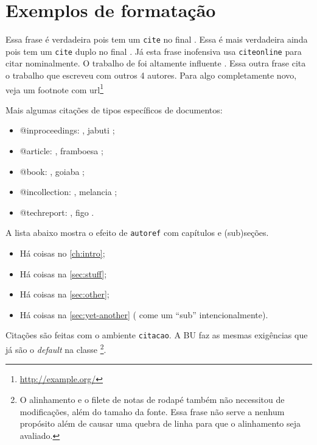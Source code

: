 \documentclass[
  english,
  lmodern,
  oneside
]{ufsc-thesis-rn46-2019/ufsc-thesis-rn46-2019}
\begin{document}
\section{Exemplos de formatação}
\label{sec:ex}

Essa frase é verdadeira pois tem um \texttt{cite} no final \cite{turing1937}. Essa
é mais verdadeira ainda pois tem um  \texttt{cite} duplo no
final \cite{turing1937,dijkstra1968}. Já esta frase inofensiva usa
 \texttt{citeonline} para citar 
nominalmente. O trabalho de  foi altamente influente
\cite{diffie1976}. Essa outra frase cita o trabalho que 
escreveu com outros 4 autores. Para algo completamente novo, veja um footnote
com url\footnote{\url{http://example.org/}}

Mais algumas citações de tipos específicos de documentos:
\begin{itemize}
\item @inproceedings: , jabuti
  \cite{Ullman1989magic};
\item @article: , framboesa \cite{Distefano2019};
\item @book: , goiaba \cite{Abiteboul1995};
\item @incollection: , melancia \cite{Forgy1989};
\item @techreport: , figo \cite{rdf11}.
\end{itemize}

A lista abaixo mostra o efeito de  \texttt{autoref} com capítulos e (sub)seções.

\begin{itemize}
\item Há coisas no \autoref{ch:intro};
\item Há coisas na \autoref{sec:stuff};
\item Há coisas na \autoref{sec:other};
\item Há coisas na \autoref{sec:yet-another} (\abnTeX{} come um ``sub'' intencionalmente).
\end{itemize}

Citações são feitas com o ambiente \texttt{citacao}. A BU faz
as mesmas exigências que já são o \textit{default} na classe
\abnTeX\footnote{O alinhamento e o filete de notas de rodapé também
não necessitou de modificações, além do tamaho da fonte. Essa frase
não serve a nenhum propósito além de causar uma quebra de linha para
que o alinhamento seja avaliado.}.
\end{document}
